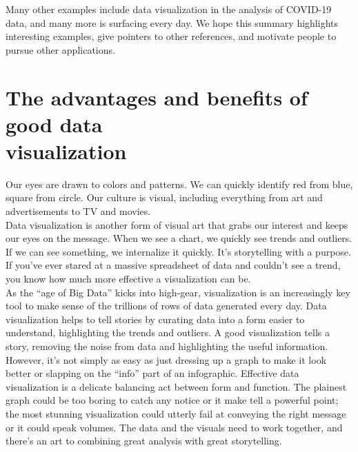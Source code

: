 Many other examples include data visualization in the analysis of COVID-19 data, and many more is surfacing every day. We hope this summary highlights interesting examples, give pointers to other references, and motivate people to pursue other applications. 
\section{The advantages and benefits of good data \\ visualization}
Our eyes are drawn to colors and patterns. We can quickly identify red from blue, square from circle. Our culture is visual, including everything from art and advertisements to TV and movies.\\

Data visualization\cite{dataviz} is another form of visual art that grabs our interest and keeps our eyes on the message. When we see a chart, we quickly see trends and outliers. If we can see something, we internalize it quickly. It’s storytelling with a purpose. If you’ve ever stared at a massive spreadsheet of data and couldn’t see a trend, you know how much more effective a visualization can be.\\

As the “age of Big Data” kicks into high-gear, visualization is an increasingly key tool to make sense of the trillions of rows of data generated every day. Data visualization helps to tell stories by curating data into a form easier to understand, highlighting the trends and outliers. A good visualization tells a story, removing the noise from data and highlighting the useful information.\\

However, it’s not simply as easy as just dressing up a graph to make it look better or slapping on the “info” part of an infographic. Effective data visualization is a delicate balancing act between form and function. The plainest graph could be too boring to catch any notice or it make tell a powerful point; the most stunning visualization could utterly fail at conveying the right message or it could speak volumes. The data and the visuals need to work together, and there’s an art to combining great analysis with great storytelling.


